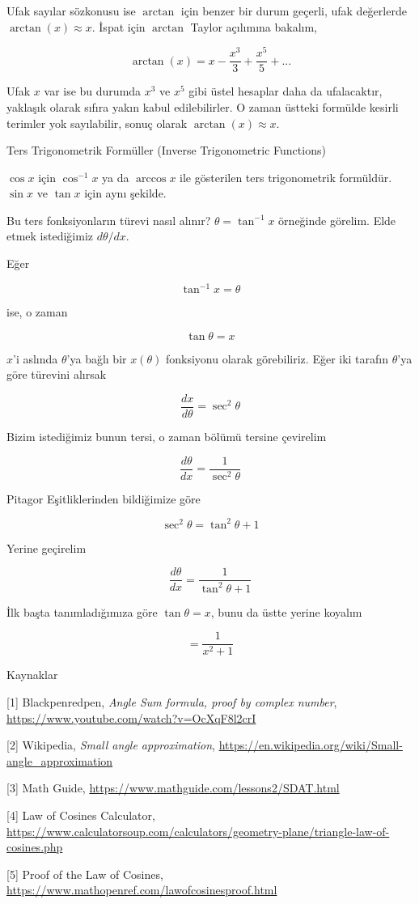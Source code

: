 \documentclass[12pt,fleqn]{article}\usepackage{../../common}
\begin{document}
Ufak sayılar sözkonusu ise $\arctan$ için benzer bir durum geçerli, ufak
değerlerde $\arctan(x) \approx x$. İspat için $\arctan$ Taylor açılımına
bakalım,

$$
\arctan(x) = x - \frac{x^3}{3} + \frac{x^5}{5} + ...
$$

Ufak $x$ var ise bu durumda $x^3$ ve $x^5$ gibi üstel hesaplar daha da
ufalacaktır, yaklaşık olarak sıfıra yakın kabul edilebilirler. O zaman üstteki
formülde kesirli terimler yok sayılabilir, sonuç olarak $\arctan(x) \approx x$.

Ters Trigonometrik Formüller (Inverse Trigonometric Functions)

$\cos x$ için $\cos^{-1} x$ ya da $\arccos x$ ile gösterilen ters
trigonometrik formüldür. $\sin x$ ve $\tan x$ için aynı şekilde. 

Bu ters fonksiyonların türevi nasıl alınır? $\theta = \tan^{-1}x$ örneğinde
görelim. Elde etmek istediğimiz $d\theta/dx$. 

Eğer

$$ \tan^{-1}x = \theta$$

ise, o zaman 

$$ \tan\theta = x $$

$x$'i aslında $\theta$'ya bağlı bir $x(\theta)$ fonksiyonu olarak görebiliriz. 
Eğer iki tarafın $\theta$'ya göre türevini alırsak

$$ \frac{dx}{d\theta} = \sec^{2}\theta $$

Bizim istediğimiz bunun tersi, o zaman bölümü tersine çevirelim

$$ \frac{d\theta}{dx} = \frac{1}{\sec^{2}\theta} $$

Pitagor Eşitliklerinden bildiğimize göre

$$ \sec^{2}\theta = \tan^{2}\theta + 1 $$

Yerine geçirelim

$$ \frac{d\theta}{dx} = \frac{1}{\tan^{2}\theta + 1} $$

İlk başta tanımladığımıza göre $\tan\theta = x$, bunu da üstte yerine
koyalım

$$  = \frac{1}{x^2 + 1} $$

Kaynaklar 

[1] Blackpenredpen, {\em Angle Sum formula, proof by complex number},
     \url{https://www.youtube.com/watch?v=OcXqF8l2crI}
     
[2] Wikipedia, {\em Small angle approximation},
    \url{https://en.wikipedia.org/wiki/Small-angle_approximation}

[3] Math Guide,
    \url{https://www.mathguide.com/lessons2/SDAT.html}

[4] Law of Cosines Calculator,
    \url{https://www.calculatorsoup.com/calculators/geometry-plane/triangle-law-of-cosines.php}

[5] Proof of the Law of Cosines,
    \url{https://www.mathopenref.com/lawofcosinesproof.html}
    
\end{document}
